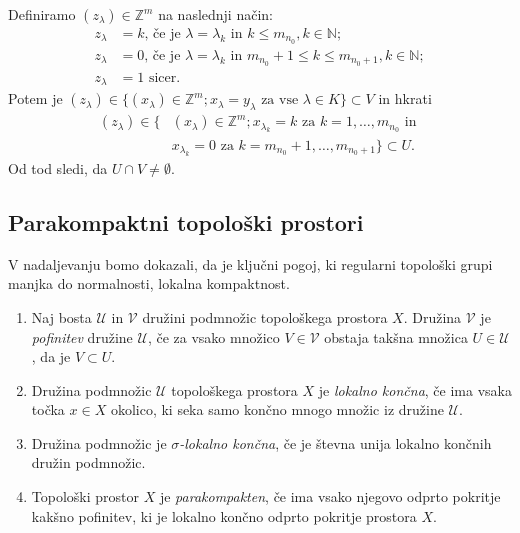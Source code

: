 \documentclass[mat1]{fmfdelo}
\newcommand{\N}{\mathbb N}
\newcommand{\Z}{\mathbb Z}
\begin{document}
\begin{dokaz}
Definiramo $(z_\lambda) \in \Z^m$ na naslednji način:
\begin{align*}
	z_\lambda &= k \text{, če je $\lambda = \lambda_k$ in $k \leq m_{n_0}$}, k \in \N; \\
	z_\lambda &= 0 \text{, če je $\lambda = \lambda_k$ in $m_{n_0} + 1 \leq k \leq m_{n_0+1}$}, k \in \N; \\
	z_\lambda &= 1 \text{ sicer.}
\end{align*}
Potem je $(z_\lambda) \in \lbrace (x_\lambda) \in \Z^m ; x_\lambda = y_\lambda \text{ za vse } \lambda  \in K \rbrace \subset V$ in hkrati
\begin{align*}
(z_\lambda) \in \lbrace &(x_\lambda) \in \Z^m ; x_{\lambda_k} = k \text{ za } k=1,\dots,m_{n_0} \text{ in }\\
& x_{\lambda_k} = 0 \text{ za } k = m_{n_0}+1,\dots, m_{n_0 + 1}\rbrace \subset U.
\end{align*}
Od tod sledi, da $U \cap V \neq \emptyset$.
\end{dokaz}

\subsection{Parakompaktni topološki prostori}
V nadaljevanju bomo dokazali, da je ključni pogoj, ki regularni topološki grupi manjka do normalnosti, lokalna kompaktnost.

\begin{definicija}\label{def:parakompakt}
	\begin{enumerate}
		\item Naj bosta $\mathcal{U}$ in $\mathcal{V}$ družini podmnožic topološkega prostora $X$. Družina $\mathcal{V}$ je \emph{pofinitev} družine $\mathcal{U}$, če za vsako množico $V \in \mathcal{V}$ obstaja takšna množica $U \in \mathcal{U}$, da je $V \subset U$.
		\item Družina podmnožic $\mathcal{U}$ topološkega prostora $X$ je \emph{lokalno končna}, če ima vsaka točka $x \in X$ okolico, ki seka samo končno mnogo množic iz družine $\mathcal{U}$.
		\item Družina podmnožic je \emph{$\sigma$-lokalno končna}, če je števna unija lokalno končnih družin podmnožic.
		\item Topološki prostor $X$ je \emph{parakompakten}, če ima vsako njegovo odprto pokritje kakšno pofinitev, ki je lokalno končno odprto pokritje prostora $X$.
	\end{enumerate}
\end{definicija}
\end{document}
